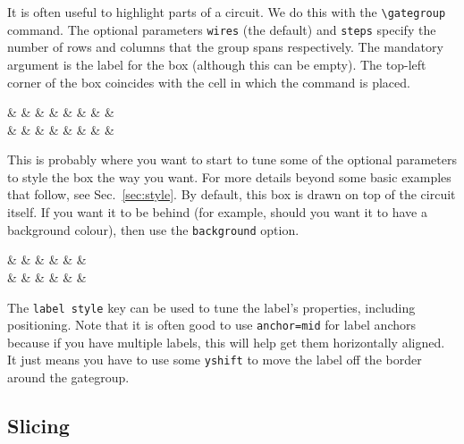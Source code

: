 \documentclass[aps,pra,10pt,nofootinbib]{revtex4-2}
\begin{document}
It is often useful to highlight parts of a circuit. We do this with the \verb!\gategroup! command. The optional parameters \verb!wires! (the default) and \verb!steps! specify the number of rows and columns that the group spans respectively. The mandatory argument is the label for the box (although this can be empty). The top-left corner of the box coincides with the cell in which the command is placed.
\begin{Code}
  \begin{quantikz}
    &  &  &  &  &  &  & & \\
    & & \targ{} &  & \targ{} &  & \targ{} &  &
  \end{quantikz}
\end{Code}
This is probably where you want to start to tune some of the optional parameters to style the box the way you want. For more details beyond some basic examples that follow, see Sec.\ \ref{sec:style}. By default, this box is drawn on top of the circuit itself. If you want it to be behind (for example, should you want it to have a background colour), then use the \verb!background! option.
\begin{Code}
  \begin{quantikz}
    &  &  & \targ{} &  & & \\
    & & \targ{} &  & \targ{} &  &
  \end{quantikz}
\end{Code}
The \verb!label style! key can be used to tune the label's properties, including positioning. Note that it is often good to use \verb!anchor=mid! for label anchors because if you have multiple labels, this will help get them horizontally aligned. It just means you have to use some \verb!yshift! to move the label off the border around the gategroup.

\subsection{Slicing}
\end{document}
